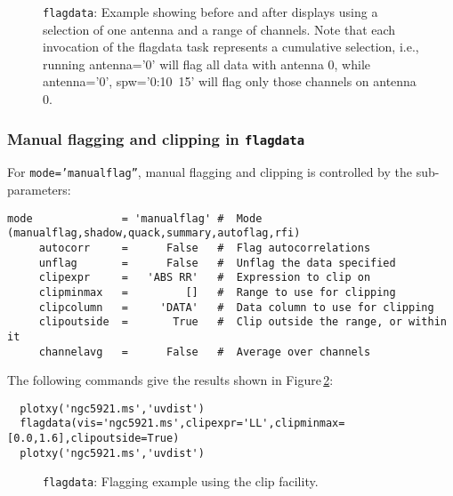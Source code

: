 \begin{figure}[h!]
\begin{center}
\caption{\label{fig:flagdata_antchan} {\tt flagdata}: Example showing before
  and after displays using a selection of one antenna and a range of
  channels. Note that each invocation of the flagdata task represents
  a cumulative selection, i.e., running antenna='0' will flag all
  data with antenna 0, while antenna='0', spw='0:10~15'
  will flag only those channels on antenna 0. }
\hrulefill
\end{center}
\end{figure}


\subsubsection{Manual flagging and clipping in {\tt flagdata}}
\label{section:edit.flagdata.clip}

For {\tt mode='manualflag''}, manual flagging and clipping is controlled by the
sub-parameters:
\small
\begin{verbatim}
mode              = 'manualflag' #  Mode (manualflag,shadow,quack,summary,autoflag,rfi)
     autocorr     =      False   #  Flag autocorrelations
     unflag       =      False   #  Unflag the data specified
     clipexpr     =   'ABS RR'   #  Expression to clip on
     clipminmax   =         []   #  Range to use for clipping
     clipcolumn   =     'DATA'   #  Data column to use for clipping
     clipoutside  =       True   #  Clip outside the range, or within it
     channelavg   =      False   #  Average over channels
\end{verbatim}
\normalsize

The following commands give the results shown in 
Figure\,\ref{fig:flagdata}:
\small
\begin{verbatim}
  plotxy('ngc5921.ms','uvdist')
  flagdata(vis='ngc5921.ms',clipexpr='LL',clipminmax=[0.0,1.6],clipoutside=True)
  plotxy('ngc5921.ms','uvdist')
\end{verbatim}
\normalsize

\begin{figure}[h!]
\begin{center}
\caption{\label{fig:flagdata} {\tt flagdata}: Flagging example using the clip facility. }
\hrulefill
\end{center}
\end{figure}


